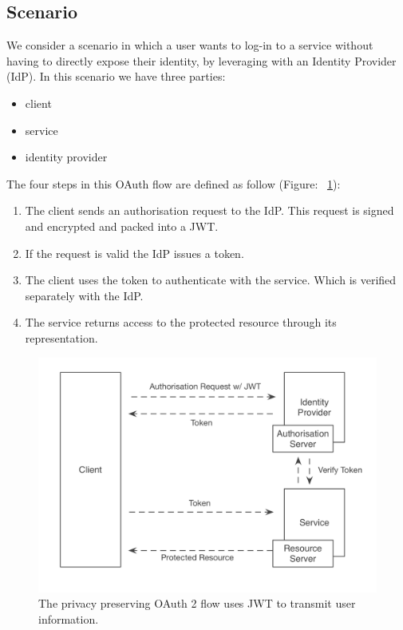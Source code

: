 \subsection{Scenario}

We consider a scenario in which a user wants to log-in to a service without having to directly expose their identity, by leveraging with an Identity Provider (IdP). In this scenario we have three parties:
\begin{itemize}
    \item client
    \item service
    \item identity provider
\end{itemize}

The four steps in this OAuth flow are defined as follow (Figure: ~\ref{fig:privateflow}):
\begin{enumerate}
    \item The client sends an authorisation request to the IdP. This request is signed and encrypted and packed into a JWT.
    \item If the request is valid the IdP issues a token.
    \item The client uses the token to authenticate with the service. Which is verified separately with the IdP.
    \item The service returns access to the protected resource through its representation.
\end{enumerate}

\begin{figure}
\includegraphics[width=\textwidth]{figures/PrivateFlow.png}
\caption[Privacy Preserving OAuth Flow with JWT.]{The privacy preserving OAuth 2 flow uses JWT to transmit user information.
\label{fig:privateflow}}
\end{figure}

